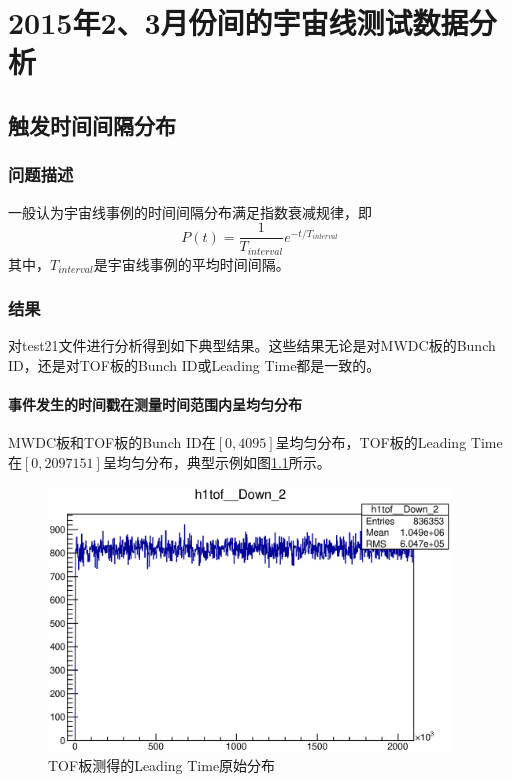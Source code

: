 \chapter{2015年2、3月份间的宇宙线测试数据分析}

\section{触发时间间隔分布}
\subsection{问题描述}
一般认为宇宙线事例的时间间隔分布满足指数衰减规律，即
\begin{equation}
	P(t) = \frac{1}{T_{interval}}e^{-t/T_{interval}}
\end{equation}
其中，$T_{interval}$是宇宙线事例的平均时间间隔。

\subsection{结果}
对test21文件进行分析得到如下典型结果。这些结果无论是对MWDC板的Bunch ID，还是对TOF板的Bunch ID或Leading Time都是一致的。

\subsubsection*{事件发生的时间戳在测量时间范围内呈均匀分布}
MWDC板和TOF板的Bunch ID在$[0,4095]$呈均匀分布，TOF板的Leading Time在$[0,2097151]$呈均匀分布，典型示例如图\ref{fig:tof_leadingtime_distribution}所示。
\begin{figure}[htbp]
	\centering
	\includegraphics[width=0.95\textwidth]{fig/tof_leadingtime_distribution.eps}
	\caption{TOF板测得的Leading Time原始分布}
	\label{fig:tof_leadingtime_distribution}
\end{figure}

